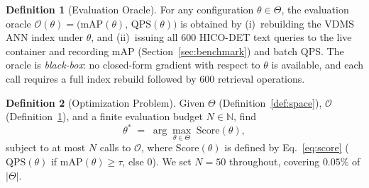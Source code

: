 \documentclass[sigconf, nonacm]{acmart}
\theoremstyle{definition}
\newtheorem{definition}{Definition}
\begin{document}
\begin{definition}[Evaluation Oracle]\label{def:oracle}
For any configuration $\theta \in \Theta$, the evaluation oracle
$\mathcal{O}(\theta) = \bigl(\mathrm{mAP}(\theta),\,\mathrm{QPS}(\theta)\bigr)$
is obtained by (i)~rebuilding the VDMS ANN index under $\theta$, and
(ii)~issuing all 600 HICO-DET text queries to the live container and recording
mAP (Section~\ref{sec:benchmark}) and batch QPS.
The oracle is \emph{black-box}: no closed-form gradient with respect to
$\theta$ is available, and each call requires a full index rebuild followed by
600 retrieval operations.
\end{definition}

\begin{definition}[Optimization Problem]\label{def:optproblem}
Given $\Theta$ (Definition~\ref{def:space}), $\mathcal{O}$ (Definition~\ref{def:oracle}),
and a finite evaluation budget $N \in \mathbb{N}$, find
\begin{equation}
  \theta^{*} \;=\; \arg\max_{\theta \in \Theta}\;
  \mathrm{Score}(\theta) ,
  \label{eq:optproblem}
\end{equation}
subject to at most $N$ calls to $\mathcal{O}$, where $\mathrm{Score}(\theta)$ is
defined by Eq.~\eqref{eq:score}
($\mathrm{QPS}(\theta)$ if $\mathrm{mAP}(\theta) \geq \tau$, else $0$).
We set $N{=}50$ throughout, covering $0.05\%$ of $|\Theta|$.
\end{definition}
\end{document}
